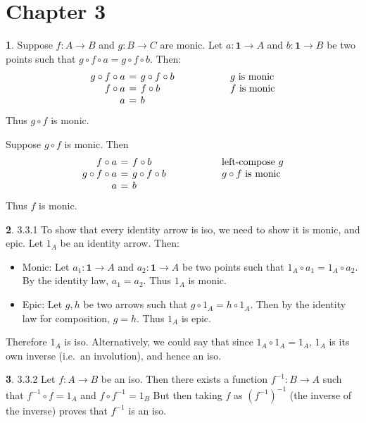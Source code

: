 \documentclass{article}
\theoremstyle{definition}
\newcommand{\point}[1]{\mathbf{1} \to #1}
\theoremstyle{definition}
\theoremstyle{definition}
\newtheorem{solution-internal}{}[subsection]
\newenvironment{solution}{
  \begin{solution-internal}
}{
  \end{solution-internal}
}
\begin{document}
\section*{Chapter 3}
\begin{solution}
  Suppose $f\colon A \to B$ and $g\colon B \to C$ are monic. Let $a\colon
  \mathbf{1} \to A$ and $b\colon \mathbf{1} \to B$ be two points
  such that $g \circ f \circ a = g \circ f \circ b$. Then:
  \[
    \arraycolsep=2pt
    \begin{array}{rcl@{\hspace{2cm}}l}
      g \circ f \circ a &=& g \circ f \circ b & \text{$g$ is monic}\\
      f \circ a &=& f \circ b & \text{$f$ is monic}\\
      a &=& b & \\
  \end{array}
  \]
  Thus $g \circ f$ is monic.

  Suppose $g \circ f$ is monic. Then
  \[
    \arraycolsep=2pt
    \begin{array}{rcl@{\hspace{2cm}}l}
      f \circ a &=& f \circ b & \text{left-compose $g$}\\
      g \circ f \circ a &=& g \circ f \circ b & \text{$g \circ f$ is monic}\\
      a &=& b & \\
  \end{array}
  \]
  Thus $f$ is monic.

\end{solution}
\begin{solution}
3.3.1 To show that every identity arrow is iso, we need to show it is monic,
and epic. Let $1_A$ be an identity arrow. Then:
\begin{itemize}
  \item Monic: Let $a_1 \colon \point{A}$ and $a_2 \colon \point{A}$ be two points
    such that $1_A \circ a_1 = 1_A \circ a_2$. By the identity law, $a_1 =
    a_2$. Thus $1_A$ is monic.
  \item Epic: Let $g, h$ be two arrows such that $g \circ 1_A = h \circ 1_A$.
    Then by the identity law for composition, $g = h$. Thus $1_A$ is epic.
\end{itemize}
Therefore $1_A$ is iso. Alternatively, we could say that since $1_A \circ 1_A
= 1_A$, $1_A$ is its own inverse (i.e.\ an involution), and hence an iso.
\end{solution}

\begin{solution}
  3.3.2
  Let $f\colon A \to B$ be an iso. Then there exists a function $f^{-1}\colon
  B \to A$ such that $f^{-1} \circ f = 1_A$ and $f \circ f^{-1} = 1_B$ But
  then taking $f$ as ${(f^{-1})}^{-1}$ (the inverse of the inverse) proves
  that $f^{-1}$ is an iso.
\end{solution}
\end{document}
